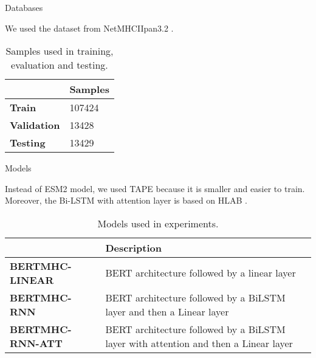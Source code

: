 \documentclass[10pt]{beamer}
\newcommand{\1}{
	\setbeamertemplate{background}{
		\texttt{[image: img/1]}
		\tikz[overlay] \fill[fill opacity=0.75,fill=white] (0,0) rectangle (-\paperwidth,\paperheight);
	}
}
\begin{document}
\begin{frame}{Databases}{}
	
	We used the dataset from NetMHCIIpan3.2 \cite{jensen2018improved}.
	
	\begin{table}[h]
		\centering
		\caption{Samples used in training, evaluation and testing.}
		\setlength{\tabcolsep}{0.8em} %
		{\renewcommand{\arraystretch}{1.3}%

		 	\begin{tabular}{ll}
		 		& \textbf{Samples}\\ \hline
		 		\textbf{Train}      & 107424        \\
		 		\textbf{Validation} & 13428        \\
		 		\textbf{Testing}    & 13429       
		 	\end{tabular}

		}
	\end{table}

\end{frame}

\begin{frame}{Models}{}
	
	Instead of ESM2 \cite{lin2023evolutionary} model, we used TAPE \cite{rao2019evaluating} because it is smaller and easier to train. Moreover, the Bi-LSTM with attention layer is based on HLAB \cite{zhang2022hlab}.
	
	\begin{table}[h]
		\centering
		\caption{Models used in experiments.}
		\setlength{\tabcolsep}{0.8em} %
		{\renewcommand{\arraystretch}{1.3}%
			
			\begin{tabular}{lp{6cm}}
				& \textbf{Description}\\ \hline
				\textbf{BERTMHC-LINEAR}      & BERT architecture followed by a linear layer        \\
				\textbf{BERTMHC-RNN} & BERT architecture followed by a BiLSTM layer and then a Linear layer        \\
				\textbf{BERTMHC-RNN-ATT}    & BERT architecture followed by a BiLSTM layer with attention and then a Linear layer       
			\end{tabular}
			
		}
	\end{table}
	
\end{frame}
\end{document}
